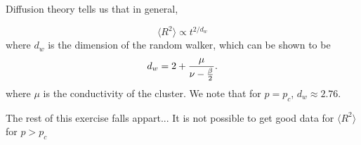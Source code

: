 \documentclass[12pt]{article}
\begin{document}
Diffusion theory tells us that in general, 

\begin{equation}
 \langle R^2 \rangle \propto t^{2/d_w}
\end{equation}
where $d_w$ is the dimension of the random walker, which can be shown to be 
\begin{equation}
 d_w = 2 + {\mu \over \nu - {\beta \over 2}}.
\end{equation}
where $\mu$ is the conductivity of the cluster. We note that for $p = p_c$, $d_w \approx 2.76$.


The rest of this exercise falls appart...  It is not possible to get good data for $\langle R^2 \rangle$ for $p>p_c$

\end{document}
